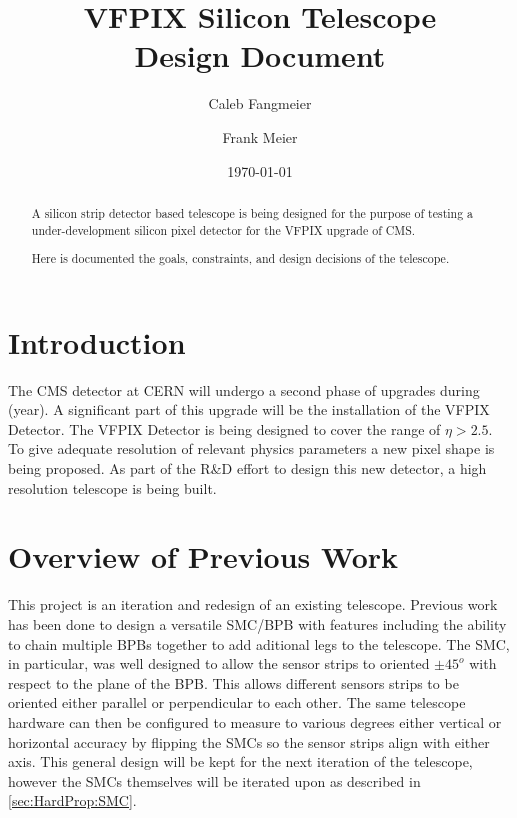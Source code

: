 \documentclass{article}
\begin{document}
\title{VFPIX Silicon Telescope \\ Design Document}
\author{Caleb Fangmeier}
\author{Frank Meier}

\date{\today}


\maketitle

\begin{abstract}
  A silicon strip detector based telescope is being designed for the purpose of testing a under-development silicon pixel detector for the VFPIX upgrade of CMS.

  Here is documented the goals, constraints, and design decisions of the telescope.
\end{abstract}

\listoftodos

\newpage

\tableofcontents

\newpage

\section{Introduction}
The \gls{CMS} detector at CERN will undergo a second phase of upgrades during (year). A significant part of this upgrade will be the installation of the \gls{VFPIX} Detector. The \gls{VFPIX} Detector is being designed to cover the range of $\eta>2.5$\cite{Dominguez2013}. To give adequate resolution of relevant physics parameters a new pixel shape is being proposed. As part of the R\&D effort to design this new detector, a high resolution telescope is being built.

\section{Overview of Previous Work}
\label{sec:PreviousWork}
This project is an iteration and redesign of an existing telescope. Previous work\cite{Turner2012} has been done to design a versatile \gls{SMC}/\gls{BPB} with features including the ability to chain multiple \gls{BPB}s together to add aditional legs to the telescope. The \gls{SMC}, in particular, was well designed to allow the sensor strips to oriented $\pm45^o$ with respect to the plane of the \gls{BPB}. This allows different sensors strips to be oriented either parallel or perpendicular to each other. The same telescope hardware can then be configured to measure to various degrees either vertical or horizontal accuracy by flipping the \gls{SMC}s so the sensor strips align with either axis. This general design will be kept for the next iteration of the telescope, however the \gls{SMC}s themselves will be iterated upon as described in \ref{sec:HardProp:SMC}.
\end{document}
